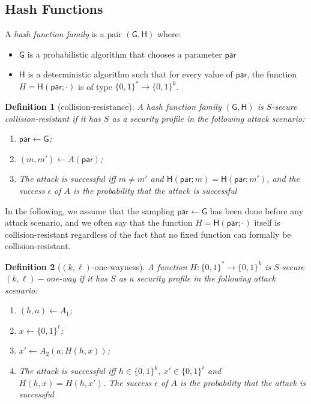 \documentclass{article}
\newtheorem{definition}{Definition}[section]
\newcommand{\bits}[1]{\{0,1\}^{#1}}
\newcommand{\hfgen}[0]{\mathsf{G}} %
\newcommand{\hfunc}[0]{\mathsf{H}} %
\newcommand{\param}[0]{\mathsf{par}}
\begin{document}
\subsection{Hash Functions}

\noindent A \emph{hash function family} is a pair $(\hfgen,\hfunc)$ where:
\begin{itemize}
\item $\hfgen$ is a probabilistic algorithm that chooses a parameter $\param$
\item $\hfunc$ is a deterministic algorithm such that for every value of $\param$, the function $H=\hfunc(\param; \cdot)$ is of type $\bits{\ast} \to \bits{k}$.
\end{itemize}

\begin{definition}[collision-resistance]
A hash function family $(\hfgen,\hfunc)$ is $S$-secure collision-resistant if it has $S$ as a security profile in the following attack scenario:
\begin{enumerate}
\item $\param \gets \hfgen$;
\item $(m,m')\gets A(\param)$;
\item The attack is successful iff $m\neq m'$ and $\hfunc(\param;m)=\hfunc(\param;m')$,
and the success $\epsilon$ of $A$ is the probability that the attack is successful
\end{enumerate}
\end{definition}

\noindent In the following, we assume that the sampling $\param \gets \hfgen$ has been done before any attack scenario, and we often say that the function $H=\hfunc(\param; \cdot)$ itself is collision-resistant regardless of the fact that no fixed function can formally be collision-resistant.

\begin{definition}[$(k,\ell)$-one-wayness]
A function $H\colon \{0,1\}^\ast\rightarrow\{0,1\}^k$
is $S$-secure $(k,\ell)-$\emph{one-way} if it has $S$ as a security profile in the following attack scenario:
\begin{enumerate}
\item $(h,a)\gets A_1$;
\item $x \gets \{0,1\}^\ell$;
\item $x'\gets A_2(a;H(h,x))$;
\item The attack is successful iff $h\in\{0,1\}^k$, $x'\in\{0,1\}^\ell$ and $H(h,x)=H(h,x')$.
The success $\epsilon$ of $A$ is the probability that the attack is successful
\end{enumerate}
\end{definition}
\end{document}

